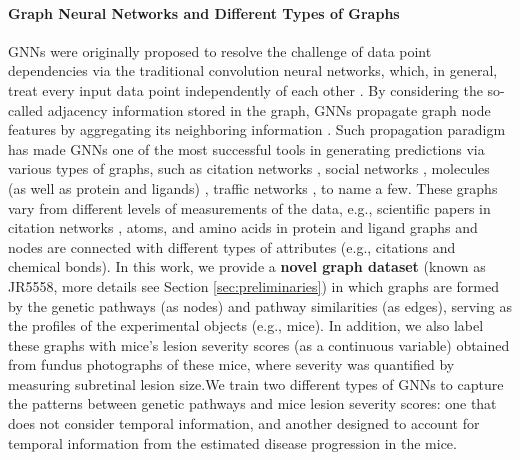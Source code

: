 \documentclass{article} %
\begin{document}
\paragraph{Graph Neural Networks and Different Types of Graphs}
GNNs were originally proposed to resolve the challenge of data point dependencies via the traditional convolution neural networks, which, in general, treat every input data point independently of each other \citep{kipf2016semi,defferrard2016convolutional}. By considering the so-called adjacency information stored in the graph, GNNs propagate graph node features by aggregating its neighboring information \citep{wu2020comprehensive}. Such propagation paradigm has made GNNs one of the most successful tools in generating predictions via various types of graphs, such as citation networks \citep{wu2020comprehensive}, social networks \citep{sharma2024survey}, molecules (as well as protein and ligands) \citep{zhang2022graph}, traffic networks \citep{jiang2022graph}, to name a few. These graphs vary from different levels of measurements of the data, e.g., scientific papers in citation networks \citep{yang2016revisiting}, atoms, and amino acids in protein and ligand graphs \citep{wu2018moleculenet,GilmerSchoenholzRiley2017} and nodes are connected with different types of attributes (e.g., citations and chemical bonds). In this work, we provide a \textbf{novel graph dataset} (known as JR5558, more details see Section \ref{sec:preliminaries}) in which graphs are formed by the genetic pathways (as nodes) and pathway similarities (as edges), serving as the profiles of the experimental objects (e.g., mice). In addition, we also label these graphs with mice's lesion severity scores (as a continuous variable) obtained from fundus photographs of these mice, where severity was quantified by measuring subretinal lesion size.We train two different types of GNNs to capture the patterns between genetic pathways and mice lesion severity scores: one that does not consider temporal information, and another designed to account for temporal information from the estimated disease progression in the mice.
\end{document}
